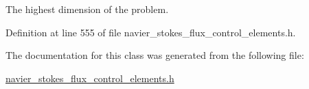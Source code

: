 The highest dimension of the problem. 



Definition at line 555 of file navier\+\_\+stokes\+\_\+flux\+\_\+control\+\_\+elements.\+h.



The documentation for this class was generated from the following file\+:\begin{DoxyCompactItemize}
\item 
\hyperlink{navier__stokes__flux__control__elements_8h}{navier\+\_\+stokes\+\_\+flux\+\_\+control\+\_\+elements.\+h}\end{DoxyCompactItemize}
